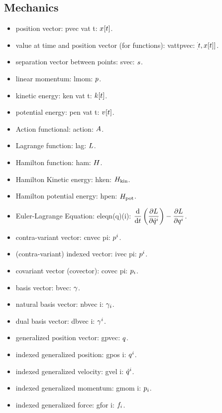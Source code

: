 \begin{multicols}{2}
\subsection{Mechanics}
\begin{itemize}
\item position vector: pvec vat t: $x\!\left[{t}\right]$.
\item value at time and position vector (for functions): vattpvec: $\!\left[{t, x\!\left[{t}\right]}\right]$.
\item separation vector between points: svec: $s$.
\item linear momentum: lmom: $p$.
\item kinetic energy: ken vat t: $k\!\left[{t}\right]$.
\item potential energy: pen vat t: $v\!\left[{t}\right]$.
\item Action functional: action: $A$.
\item Lagrange function: lag: $L$.
\item Hamilton function: ham: $H$.
%
\item Hamilton Kinetic energy: hken: $H_\text{kin}$.
\item Hamilton potential energy: hpen: $H_\text{pot}$.
%
\item Euler-Lagrange Equation: eleqn(q)(i): $\dfrac{\text{d}{}}{\text{d}{t}} \left(\dfrac{\partial{L}}{\partial{{\dot{q}}^{i}}}\right) - \dfrac{\partial{L}}{\partial{{q}^{i}}}$.
%
\item contra-variant vector: cnvec pi: ${p}^{i}$.
\item (contra-variant) indexed vector: ivec pi: ${p}^{i}$.
\item covariant vector (covector): covec pi: ${p}_{i}$.
%
\item basis vector: bvec: $\gamma$.
\item natural basis vector: nbvec i: $\gamma_{i}$.
\item dual basis vector: dbvec i: $\gamma^{i}$.
%
\item generalized position vector: gpvec: $q$.
\item indexed generalized position: gpos i: ${q}^{i}$.
\item indexed generalized velocity: gvel i: ${\dot{q}}^{i}$.
\item indexed generalized momentum: gmom i: ${p}_{i}$.
\item indexed generalized force: gfor i: ${f}_{i}$.
\end{itemize}



\end{multicols}
